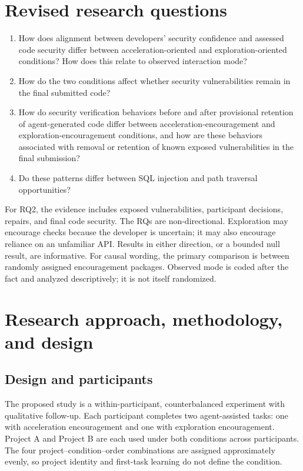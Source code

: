 \documentclass[12pt,a4paper]{article}
\begin{document}
\section{Revised research questions}
\begin{enumerate}[label=RQ\arabic*.,leftmargin=2.5em]
  \item How does alignment between developers' security confidence and assessed code security differ between acceleration-oriented and exploration-oriented conditions? How does this relate to observed interaction mode?
  \item How do the two conditions affect whether security vulnerabilities remain in the final submitted code?
  \item How do security verification behaviors before and after provisional retention of agent-generated code differ between acceleration-encouragement and exploration-encouragement conditions, and how are these behaviors associated with removal or retention of known exposed vulnerabilities in the final submission?
  \item Do these patterns differ between SQL injection and path traversal opportunities?
\end{enumerate}
For RQ2, the evidence includes exposed vulnerabilities, participant decisions, repairs, and final code security. The RQs are non-directional. Exploration may encourage checks because the developer is uncertain; it may also encourage reliance on an unfamiliar API. Results in either direction, or a bounded null result, are informative. For causal wording, the primary comparison is between randomly assigned encouragement packages. Observed mode is coded after the fact and analyzed descriptively; it is not itself randomized.

\section{Research approach, methodology, and design}

\subsection{Design and participants}
The proposed study is a within-participant, counterbalanced experiment with qualitative follow-up. Each participant completes two agent-assisted tasks: one with acceleration encouragement and one with exploration encouragement. Project A and Project B are each used under both conditions across participants. The four project--condition--order combinations are assigned approximately evenly, so project identity and first-task learning do not define the condition.
\end{document}
